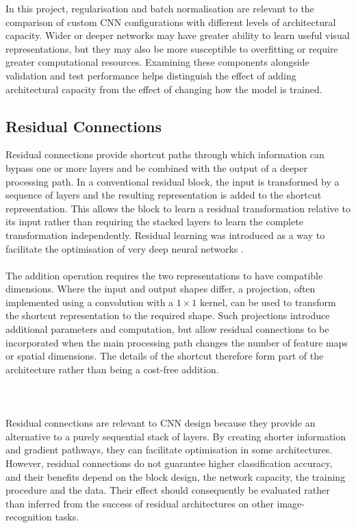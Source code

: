 \documentclass[12pt, a4paper]{report}
\let\oldsubsection\subsection
\renewcommand{\subsection}{%
    \Needspace{6\baselineskip}%
    \oldsubsection
}
\begin{document}
				 In this project, regularisation and batch normalisation are relevant to the comparison of custom CNN configurations with different levels of architectural capacity. Wider or deeper networks may have greater ability to learn useful visual representations, but they may also be more susceptible to overfitting or require greater computational resources. Examining these components alongside validation and test performance helps distinguish the effect of adding architectural capacity from the effect of changing how the model is trained.

				
			\subsection{Residual Connections}
				
				Residual connections provide shortcut paths through which information can bypass one or more layers and be combined with the output of a deeper processing path. In a conventional residual block, the input is transformed by a sequence of layers and the resulting representation is added to the shortcut representation. This allows the block to learn a residual transformation relative to its input rather than requiring the stacked layers to learn the complete transformation independently. Residual learning was introduced as a way to facilitate the optimisation of very deep neural networks \cite{he2016resnet}.\\\\
				The addition operation requires the two representations to have compatible dimensions. Where the input and output shapes differ, a projection, often implemented using a convolution with a $1\times1$ kernel, can be used to transform the shortcut representation to the required shape. Such projections introduce additional parameters and computation, but allow residual connections to be incorporated when the main processing path changes the number of feature maps or spatial dimensions. The details of the shortcut therefore form part of the architecture rather than being a cost-free addition.\\\\\\\\
				 Residual connections are relevant to CNN design because they provide an alternative to a purely sequential stack of layers. By creating shorter information and gradient pathways, they can facilitate optimisation in some architectures. However, residual connections do not guarantee higher classification accuracy, and their benefits depend on the block design, the network capacity, the training procedure and the data. Their effect should consequently be evaluated rather than inferred from the success of residual architectures on other image-recognition tasks.\\\\
\end{document}
